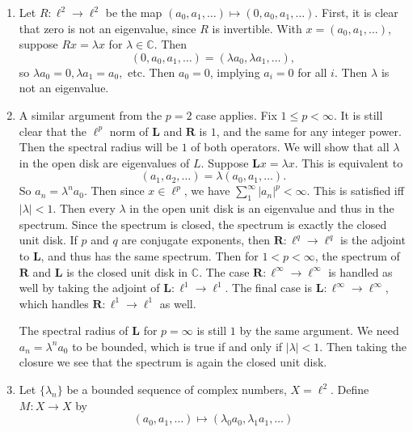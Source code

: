 \documentclass[11pt, reqno]{article}
\theoremstyle{plain}
\theoremstyle{definition}
\theoremstyle{remark}
\newcommand{\CC}{\mathbb{C}}
\begin{document}
\begin{enumerate}

    \item[2.] Let $R: \ell^2 \to \ell^2$ be the map
    $(a_0, a_1, \dots) \mapsto (0, a_0, a_1, \dots)$. First, it is clear that
    zero is not an eigenvalue, since $R$ is invertible. With $x = (a_0, a_1, \dots)$, suppose 
    $Rx = \lambda x$ for $\lambda \in \CC$. Then
    \[
        (0, a_0, a_1, \dots) = (\lambda a_0, \lambda a_1, \dots),
    \]
    so $\lambda a_0 = 0, \lambda a_1 = a_0,$ etc. Then $a_0 = 0$, implying $a_i = 0$ for all $i$.
    Then $\lambda$ is not an eigenvalue. 

    \item[3.] A similar argument from the $p = 2$ case applies. Fix $1 \leq p < \infty$. It is still clear
    that the $\ell^p$ norm of $\textbf{L}$ and $\textbf{R}$ is $1$, and the same for
    any integer power. Then the spectral radius will be $1$ of both operators. We 
    will show that all $\lambda$ in the open disk are eigenvalues of $L$. Suppose 
    $\textbf{L}x = \lambda x$. This is equivalent to 
    \[
        (a_1, a_2, \dots) = \lambda(a_0, a_1, \dots).
    \]
    So $a_n = \lambda^n a_0$. Then since $x \in \ell^p$, we have $\sum_{1}^\infty |a_n|^p < \infty$.
    This is satisfied iff $|\lambda| < 1$. Then every $\lambda$ in the open unit disk 
    is an eigenvalue and thus in the spectrum. Since the spectrum is closed,
    the spectrum is exactly the closed unit disk. 
    If $p$ and $q$ are conjugate exponents, then $\textbf{R}: \ell^q \to \ell^q$
    is the adjoint to $\textbf{L}$, and thus has the same spectrum. Then for $1 < p < \infty$,
    the spectrum of $\textbf{R}$ and $\textbf{L}$ is the closed unit disk in $\CC$.
    The case $\textbf{R}: \ell^\infty \to \ell^\infty$ is handled as well by taking
    the adjoint of $\textbf{L}: \ell^1 \to \ell^1$. The final case 
    is $\textbf{L}: \ell^\infty \to \ell^\infty$, which handles $\textbf{R}: \ell^1 \to \ell^1$ as
    well. 

    The spectral radius of $\textbf{L}$ for $p = \infty$ is still $1$ by the same argument.
    We need $a_n = \lambda^n a_0$ to be bounded, which is true if and only if $|\lambda| < 1$. 
    Then taking the closure we see that the spectrum is again the closed unit disk. 

    \item[4.] Let $\{\lambda_n\}$ be a bounded sequence of complex numbers, $X = \ell^2$. 
    Define $M: X \to X$ by 
    \[
        (a_0, a_1, \dots) \mapsto (\lambda_0 a_0, \lambda_1 a_1, \dots)
    \]


\end{enumerate}
\end{document}
